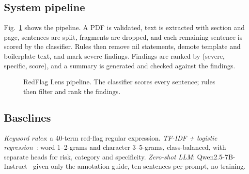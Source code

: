 \documentclass[conference]{IEEEtran}
\begin{document}
\subsection{System pipeline}
Fig.~\ref{fig:pipeline} shows the pipeline. A PDF is validated, text is extracted with section and page, sentences are split, fragments are dropped, and each remaining sentence is scored by the classifier. Rules then remove nil statements, demote template and boilerplate text, and mark severe findings. Findings are ranked by (severe, specific, score), and a summary is generated and checked against the findings.

\begin{figure}[t]
\centering
{}
\caption{RedFlag Lens pipeline. The classifier scores every sentence; rules then filter and rank the findings.}
\label{fig:pipeline}
\end{figure}

\subsection{Baselines}
\emph{Keyword rules}: a 40-term red-flag regular expression. \emph{TF-IDF + logistic regression}~\cite{pedregosa2011}: word 1--2-grams and character 3--5-grams, class-balanced, with separate heads for risk, category and specificity. \emph{Zero-shot LLM}: Qwen2.5-7B-Instruct~\cite{qwen2024} given only the annotation guide, ten sentences per prompt, no training.
\end{document}
